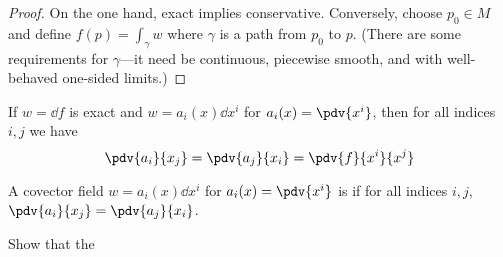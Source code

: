 \begin{proof}
On the one hand, exact implies conservative. Conversely, choose $p_0 \in M$ and define $f(p) = \int_\gamma w$ where $\gamma$ is a path from $p_0$ to $p$.
(There are some requirements for $\gamma$---it need be continuous, piecewise smooth, and with well-behaved one-sided limits.)
\end{proof}

\begin{prop}
   If $w = \dd{f}$ is exact and $w = a_i(x) \dd{x^i}$ for $a_i(x) = \pdv{x^i}$, then for all indices $i,j$ we have
   \begin{equation*}
       \pdv{a_i}{x_j} = 
       \pdv{a_j}{x_i} =
       \pdv{f}{x^i}{x^j}
   \end{equation*}
\end{prop}

\begin{defn}[]
    A covector field $w = a_i(x) \dd{x^i}$ for $a_i(x) = \pdv{x^i}$ is  if for all indices $i,j$, $\pdv{a_i}{x_j} = \pdv{a_j}{x_i}$.
\end{defn}

\begin{todo}[]
    Show that the 
\end{todo}
